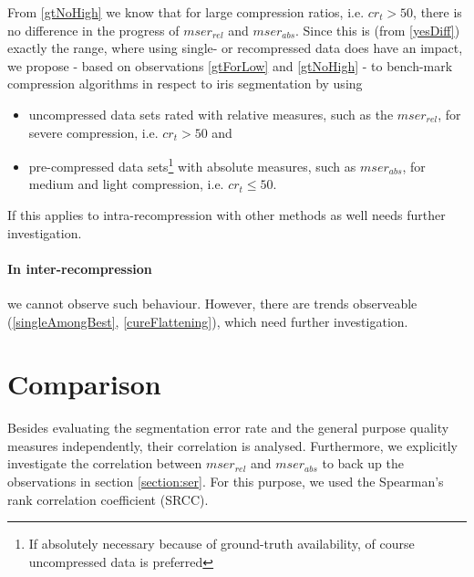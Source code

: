 \documentclass[10pt,twocolumn,letterpaper]{article}
\begin{document}
From \ref{gtNoHigh} we know that for large compression ratios, i.e. $cr_t > 50$, there is no difference in the progress of $mser_{rel}$ and $mser_{abs}$. Since this is (from \ref{yesDiff}) exactly the range, where using single- or recompressed data does have an impact, we propose - based on observations \ref{gtForLow} and \ref{gtNoHigh} - to bench-mark compression algorithms in respect to iris segmentation by using 
\begin{itemize}
	
	\item uncompressed data sets rated with relative measures, such as the $mser_{rel}$, for severe compression, i.e. $cr_t > 50$ and
	\item pre-compressed data sets\footnote{If absolutely necessary because of ground-truth availability, of course uncompressed data is preferred} with absolute measures, such as $mser_{abs}$, for medium and light compression, i.e. $cr_t \leq 50$.
\end{itemize}

If this applies to intra-recompression with other methods as well needs further investigation.

\paragraph{In inter-recompression} we cannot observe such behaviour. However, there are trends observeable (\ref{singleAmongBest}, \ref{cureFlattening}), which need further investigation. 


\section{Comparison}
\label{section:comparison}
Besides evaluating the segmentation error rate and the general purpose quality measures independently, their correlation is analysed. Furthermore, we explicitly investigate the correlation between $mser_{rel}$ and $mser_{abs}$ to back up the observations in section \ref{section:ser}.
For this purpose, we used the Spearman's rank correlation coefficient (SRCC).
\end{document}

